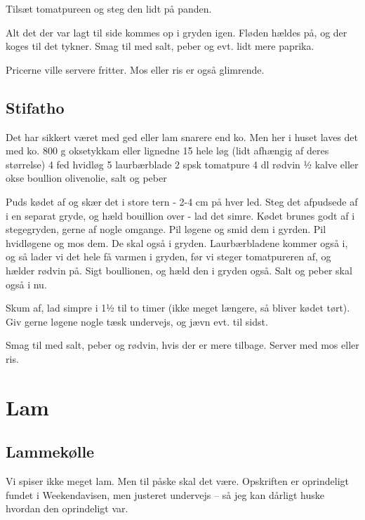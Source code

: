 \documentclass[
  letterpaper,
  DIV=11,
  numbers=noendperiod]{scrreprt}
\begin{document}
Tilsæt tomatpureen og steg den lidt på panden.

Alt det der var lagt til side kommes op i gryden igen. Fløden hældes på,
og der koges til det tykner. Smag til med salt, peber og evt. lidt mere
paprika.

Pricerne ville servere fritter. Mos eller ris er også glimrende.

\hypertarget{stifatho}{%
\section{Stifatho}\label{stifatho}}

Det har sikkert været med ged eller lam snarere end ko. Men her i huset
laves det med ko. 800 g oksetykkam eller lignedne 15 hele løg (lidt
afhængig af deres størrelse) 4 fed hvidløg 5 laurbærblade 2 spsk
tomatpure 4 dl rødvin ½ kalve eller okse boullion olivenolie, salt og
peber

Puds kødet af og skær det i store tern - 2-4 cm på hver led. Steg det
afpudsede af i en separat gryde, og hæld bouillion over - lad det simre.
Kødet brunes godt af i stegegryden, gerne af nogle omgange. Pil løgene
og smid dem i gyrden. Pil hvidløgene og mos dem. De skal også i gryden.
Laurbærbladene kommer også i, og så lader vi det hele få varmen i
gryden, før vi steger tomatpureren af, og hælder rødvin på. Sigt
boullionen, og hæld den i gryden også. Salt og peber skal også i nu.

Skum af, lad simpre i 1½ til to timer (ikke meget længere, så bliver
kødet tørt). Giv gerne løgene nogle tæsk undervejs, og jævn evt. til
sidst.

Smag til med salt, peber og rødvin, hvis der er mere tilbage. Server med
mos eller ris.


\hypertarget{lam}{%
\chapter{Lam}\label{lam}}

\hypertarget{lammekuxf8lle}{%
\section{Lammekølle}\label{lammekuxf8lle}}

Vi spiser ikke meget lam. Men til påske skal det være. Opskriften er
oprindeligt fundet i Weekendavisen, men justeret undervejs -- så jeg kan
dårligt huske hvordan den oprindeligt var.
\end{document}
